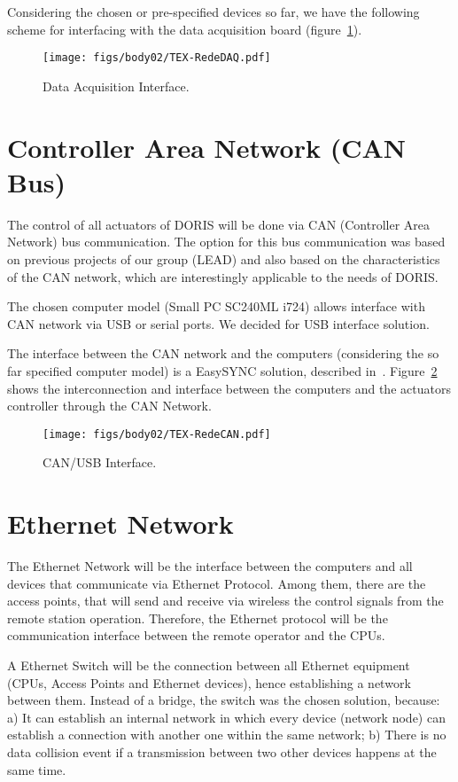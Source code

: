 Considering the chosen or pre-specified devices so far, we have the following scheme for interfacing with the data acquisition board (figure~\ref{FIG:INTERFACEDAQ}).
\begin{figure}[H]
  \centering
  \texttt{[image: figs/body02/TEX-RedeDAQ.pdf]}\\
  \caption[Data Acquisition Interface]{Data Acquisition Interface.}
  \label{FIG:INTERFACEDAQ}
\end{figure}


\section{Controller Area Network (CAN Bus)}
The control of all actuators of DORIS will be done via CAN (Controller Area Network) bus communication. The option for this bus communication was based on previous projects of our group (LEAD) and also based on the characteristics of the CAN network, which are interestingly applicable to the needs of DORIS.

The chosen computer model (Small PC SC240ML i724) allows interface with CAN network via USB or serial ports. We decided for USB interface solution.

The interface between the CAN network and the computers (considering the so far specified computer model) is a EasySYNC solution, described in~\cite{USB22013Easy}. Figure~\ref{FIG:INTERFACECAN} shows the interconnection and interface between the computers and the actuators controller through the CAN Network.
\begin{figure}[H]
  \centering
  \texttt{[image: figs/body02/TEX-RedeCAN.pdf]}\\
  \caption[CAN/USB Interface]{CAN/USB Interface.}
  \label{FIG:INTERFACECAN}
\end{figure}
\newpage
\section{Ethernet Network}
The Ethernet Network will be the interface between the computers and all devices that communicate via Ethernet Protocol. Among them, there are the access points, that will send and receive via wireless the control signals from the remote station operation. Therefore, the Ethernet protocol will be the communication interface between the remote operator and the CPUs.

A Ethernet Switch will be the connection between all Ethernet equipment (CPUs, Access Points and Ethernet devices), hence establishing a network between them. Instead of a bridge, the switch was the chosen solution, because: a) It can establish an internal network in which every device (network node) can establish a connection with another one within the same network; b) There is no data collision event if a transmission between two other devices happens at the same time.

